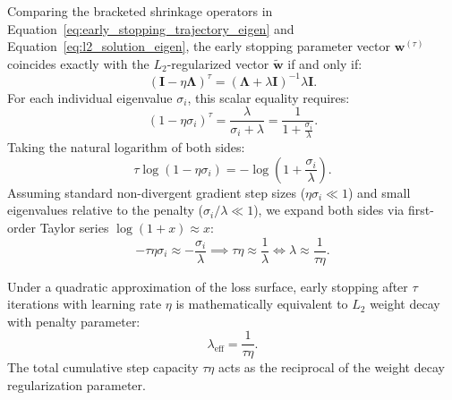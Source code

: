 Comparing the bracketed shrinkage operators in Equation~\eqref{eq:early_stopping_trajectory_eigen} and Equation~\eqref{eq:l2_solution_eigen}, the early stopping parameter vector $\mathbf{w}^{(\tau)}$ coincides exactly with the $L_2$-regularized vector $\tilde{\mathbf{w}}$ if and only if:
\begin{equation}
(\mathbf{I} - \eta \boldsymbol{\Lambda})^\tau = (\boldsymbol{\Lambda} + \lambda \mathbf{I})^{-1} \lambda \mathbf{I}.
\label{eq:shrinkage_equivalence_condition}
\end{equation}
For each individual eigenvalue $\sigma_i$, this scalar equality requires:
\begin{equation}
(1 - \eta \sigma_i)^\tau = \frac{\lambda}{\sigma_i + \lambda} = \frac{1}{1 + \frac{\sigma_i}{\lambda}}.
\end{equation}
Taking the natural logarithm of both sides:
\begin{equation}
\tau \log(1 - \eta \sigma_i) = -\log\left(1 + \frac{\sigma_i}{\lambda}\right).
\end{equation}
Assuming standard non-divergent gradient step sizes ($\eta \sigma_i \ll 1$) and small eigenvalues relative to the penalty ($\sigma_i / \lambda \ll 1$), we expand both sides via first-order Taylor series $\log(1 + x) \approx x$:
\begin{equation}
-\tau \eta \sigma_i \approx -\frac{\sigma_i}{\lambda} \implies \tau \eta \approx \frac{1}{\lambda} \iff \lambda \approx \frac{1}{\tau \eta}.
\label{eq:bishop_equivalence_relation}
\end{equation}

\begin{theorem}
Under a quadratic approximation of the loss surface, early stopping after $\tau$ iterations with learning rate $\eta$ is mathematically equivalent to $L_2$ weight decay with penalty parameter:
\begin{equation}
\lambda_{\text{eff}} = \frac{1}{\tau \eta}.
\end{equation}
The total cumulative step capacity $\tau \eta$ acts as the reciprocal of the weight decay regularization parameter.
\end{theorem}

